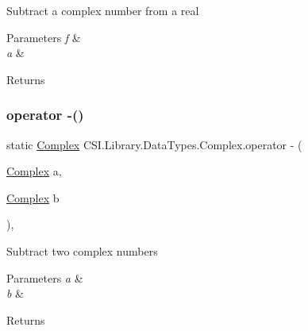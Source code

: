 Subtract a complex number from a real 


\begin{DoxyParams}{Parameters}
{\em f} & \\
\hline
{\em a} & \\
\hline
\end{DoxyParams}
\begin{DoxyReturn}{Returns}

\end{DoxyReturn}
\mbox{\label{struct_c_s_i_1_1_library_1_1_data_types_1_1_complex_a64756895a777cb7d1480ad4522d4651a}} 
\subsubsection{\texorpdfstring{operator -\/()}{operator -()}\hspace{0.1cm}{\footnotesize\ttfamily [4/4]}}
{\footnotesize\ttfamily static \mbox{\hyperlink{struct_c_s_i_1_1_library_1_1_data_types_1_1_complex}{Complex}} C\+S\+I.\+Library.\+Data\+Types.\+Complex.\+operator -\/ (\begin{DoxyParamCaption}\item[{\mbox{\hyperlink{struct_c_s_i_1_1_library_1_1_data_types_1_1_complex}{Complex}}}]{a,  }\item[{\mbox{\hyperlink{struct_c_s_i_1_1_library_1_1_data_types_1_1_complex}{Complex}}}]{b }\end{DoxyParamCaption})\hspace{0.3cm}{\ttfamily [inline]}, {\ttfamily [static]}}



Subtract two complex numbers 


\begin{DoxyParams}{Parameters}
{\em a} & \\
\hline
{\em b} & \\
\hline
\end{DoxyParams}
\begin{DoxyReturn}{Returns}

\end{DoxyReturn}
\mbox{\label{struct_c_s_i_1_1_library_1_1_data_types_1_1_complex_a902ad0d7e47586efa28f30e40c8268e3}} 
